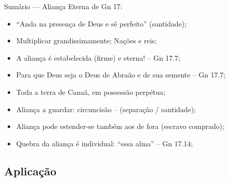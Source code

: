\documentclass[12pt,aspectratio=169]{beamer}
\newcommand{\RED}[1]{{\textcolor{TXred}{#1}}}
\newcommand{\ORA}[1]{{\textcolor{TXred!50!TXyel}{#1}}}
\newcommand{\YEL}[1]{{\textcolor{TXyel}{#1}}}
\newcommand{\GRE}[1]{{\textcolor{TXgre}{#1}}}
\newcommand{\CYA}[1]{{\textcolor{TXcya}{#1}}}
\newcommand{\BLU}[1]{{\textcolor{TXblu}{#1}}}
\newcommand{\MAG}[1]{{\textcolor{TXmag}{#1}}}
\newcommand{\BRI}[1]{{\textcolor{BSpbg}{#1}}}   %
\begin{document}
    \begin{frame}
        \par\noindent\hspace*{0.05\linewidth}%
        \begin{minipage}{0.9\linewidth}%
            \large%
            \begin{alertblock}{Sumário --- \YEL{Aliança Eterna} de \BRI{Gn 17}:}
                \normalsize
                \begin{itemize}
					\item<1-> ``\MAG{Anda na presença} de Deus e \MAG{sê perfeito}'' (santidade);
					\item<1-> Multiplicar \YEL{grandissimamente}; Nações e \GRE{reis};
					\item<1-> A aliança é \YEL{estabelecida} (firme) e \CYA{eterna!} -- Gn 17.7;
					\item<1-> Para que \BLU{Deus seja o Deus de Abraão e de sua semente} -- Gn 17.7;
					\item<1-> Toda a \YEL{terra} de Canaã, em \GRE{possessão} \YEL{perpétua};
					\item<1-> Aliança a guardar: \MAG{circuncisão} -- (separação / santidade);
					\item<1-> Aliança pode estender-se também \ORA{aos de fora} (escravo comprado);
					\item<1-> \RED{Quebra} da aliança é \YEL{individual}: ``\YEL{essa alma}'' -- Gn
						17.14;
                \end{itemize}
            \end{alertblock}
        \end{minipage}%
    \end{frame}

    \subsection{Aplicação}
\end{document}
